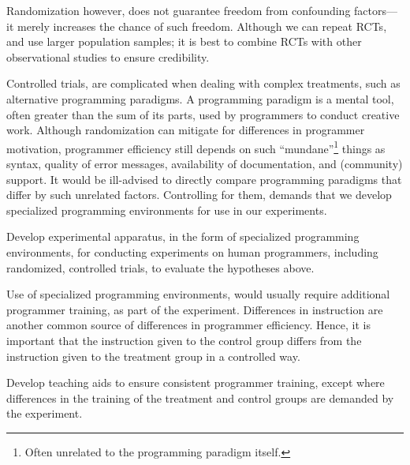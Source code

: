 Randomization however, does not guarantee freedom from confounding
factors---it merely increases the chance of such freedom. Although we
can repeat RCTs, and use larger population samples; it is best to
combine RCTs with other observational studies to ensure
credibility\cite{2018-Understanding-and-misunderstanding-RCTs}. 

Controlled trials, are complicated when dealing with complex
treatments, such as alternative programming paradigms. A programming
paradigm is a mental tool, often greater than the sum of its parts,
used by programmers to conduct creative work. Although randomization
can mitigate for differences in programmer motivation, programmer
efficiency still depends on such ``mundane''\footnote{Often unrelated
to the programming paradigm itself.} things as
syntax\cite{2013-Stefik-Siebert-Syntax}, quality of error
messages\cite{2011-Mind-your-language}, availability of documentation,
and (community) support. It would be ill-advised to directly compare
programming paradigms that differ by such unrelated factors.
Controlling for them, demands that we develop specialized programming
environments for use in our experiments.

\begin{scientific-challenge} \label{challenge:apparatus}

Develop experimental apparatus, in the form of specialized programming
environments, for conducting experiments on human programmers,
including randomized, controlled trials, to evaluate the hypotheses
above.

\end{scientific-challenge}

Use of specialized programming environments, would usually require
additional programmer training, as part of the experiment. Differences
in instruction are another common source of differences in programmer
efficiency. Hence, it is important that the instruction given to the
control group differs from the instruction given to the treatment
group in a controlled way.

\begin{scientific-challenge} \label{challenge:teaching-aids}

Develop teaching aids to ensure consistent programmer training, except
where differences in the training of the treatment and control groups
are demanded by the experiment.

\end{scientific-challenge}


